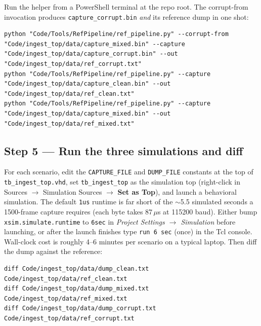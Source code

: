 \documentclass[11pt,letterpaper]{article}
\begin{document}
Run the helper from a PowerShell terminal at the repo root. The corrupt-from invocation produces \texttt{capture\_corrupt.bin} \emph{and} its reference dump in one shot:

\begin{lstlisting}[caption={Shell commands (PowerShell-friendly single lines) to produce the corrupted capture and all three reference dumps.}]
python "Code/Tools/RefPipeline/ref_pipeline.py" --corrupt-from "Code/ingest_top/data/capture_mixed.bin" --capture "Code/ingest_top/data/capture_corrupt.bin" --out "Code/ingest_top/data/ref_corrupt.txt"
python "Code/Tools/RefPipeline/ref_pipeline.py" --capture "Code/ingest_top/data/capture_clean.bin" --out "Code/ingest_top/data/ref_clean.txt"
python "Code/Tools/RefPipeline/ref_pipeline.py" --capture "Code/ingest_top/data/capture_mixed.bin" --out "Code/ingest_top/data/ref_mixed.txt"
\end{lstlisting}

\subsection{Step 5 --- Run the three simulations and diff}

For each scenario, edit the \texttt{CAPTURE\_FILE} and \texttt{DUMP\_FILE} constants at the top of \texttt{tb\_ingest\_top.vhd}, set \texttt{tb\_ingest\_top} as the simulation top (right-click in Sources $\to$ Simulation Sources $\to$ \textbf{Set as Top}), and launch a behavioral simulation. The default \texttt{1us} runtime is far short of the $\sim$5.5 simulated seconds a 1500-frame capture requires (each byte takes 87\,$\mu$s at 115200 baud). Either bump \texttt{xsim.simulate.runtime} to \texttt{6sec} in \textit{Project Settings $\to$ Simulation} before launching, or after the launch finishes type \texttt{run 6 sec} (once) in the Tcl console. Wall-clock cost is roughly 4--6 minutes per scenario on a typical laptop. Then diff the dump against the reference:

\begin{lstlisting}[caption={Compare each simulation dump against its Python reference. PowerShell users: substitute \texttt{Compare-Object} or use Git Bash / WSL for \texttt{diff}.}]
diff Code/ingest_top/data/dump_clean.txt   Code/ingest_top/data/ref_clean.txt
diff Code/ingest_top/data/dump_mixed.txt   Code/ingest_top/data/ref_mixed.txt
diff Code/ingest_top/data/dump_corrupt.txt Code/ingest_top/data/ref_corrupt.txt
\end{lstlisting}
\end{document}
